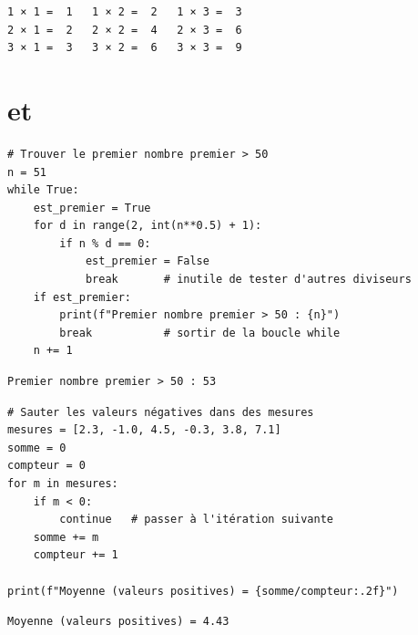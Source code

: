 \begin{codeoutput}
\begin{verbatim}
1 × 1 =  1   1 × 2 =  2   1 × 3 =  3
2 × 1 =  2   2 × 2 =  4   2 × 3 =  6
3 × 1 =  3   3 × 2 =  6   3 × 3 =  9
\end{verbatim}
\end{codeoutput}

\section{ et }

\begin{codeblock}[title=\textbf{Python}]
\begin{verbatim}
# Trouver le premier nombre premier > 50
n = 51
while True:
    est_premier = True
    for d in range(2, int(n**0.5) + 1):
        if n % d == 0:
            est_premier = False
            break       # inutile de tester d'autres diviseurs
    if est_premier:
        print(f"Premier nombre premier > 50 : {n}")
        break           # sortir de la boucle while
    n += 1
\end{verbatim}
\end{codeblock}

\begin{codeoutput}
\begin{verbatim}
Premier nombre premier > 50 : 53
\end{verbatim}
\end{codeoutput}

\begin{codeblock}[title=\textbf{Python}]
\begin{verbatim}
# Sauter les valeurs négatives dans des mesures
mesures = [2.3, -1.0, 4.5, -0.3, 3.8, 7.1]
somme = 0
compteur = 0
for m in mesures:
    if m < 0:
        continue   # passer à l'itération suivante
    somme += m
    compteur += 1

print(f"Moyenne (valeurs positives) = {somme/compteur:.2f}")
\end{verbatim}
\end{codeblock}

\begin{codeoutput}
\begin{verbatim}
Moyenne (valeurs positives) = 4.43
\end{verbatim}
\end{codeoutput}

